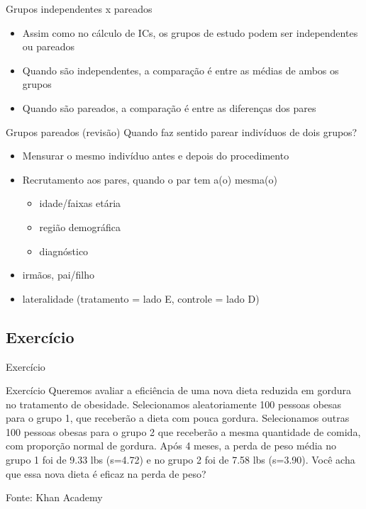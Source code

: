 \documentclass{beamer}
\begin{document}
\begin{frame}{Grupos independentes x pareados}
  \begin{itemize}
  \item Assim como no cálculo de ICs, os grupos de estudo podem ser independentes ou pareados
  \item Quando são independentes, a comparação é entre as médias de ambos os grupos
  \item Quando são pareados, a comparação é entre as diferenças dos pares
  \end{itemize}
\end{frame}


\begin{frame}{Grupos pareados (revisão)}
Quando faz sentido parear indivíduos de dois grupos?
  \begin{itemize}
  \item Mensurar o \alert{mesmo} indivíduo antes e depois do procedimento
  \item Recrutamento aos pares, quando o par tem a(o) mesma(o)
    \begin{itemize}
    \item idade/faixas etária
    \item região demográfica
    \item diagnóstico
    \end{itemize}
  \item irmãos, pai/filho
  \item lateralidade (tratamento = lado E, controle = lado D)
  \end{itemize}
\end{frame}

\subsection{Exercício}

\begin{frame}{Exercício}
  \begin{exampleblock}{Exercício}
    Queremos avaliar a eficiência de uma nova dieta reduzida em
    gordura no tratamento de obesidade. Selecionamos aleatoriamente
    100 pessoas obesas para o grupo 1, que receberão a dieta com pouca
    gordura. Selecionamos outras 100 pessoas obesas para o grupo 2 que
    receberão a mesma quantidade de comida, com proporção normal de
    gordura. Após 4 meses, a perda de peso média no grupo 1 foi de
    9.33 lbs (s=4.72) e no grupo 2 foi de 7.58 lbs (s=3.90). Você acha
    que essa nova dieta é eficaz na perda de peso?
  \end{exampleblock}
  Fonte: Khan Academy
\end{frame}
\end{document}
